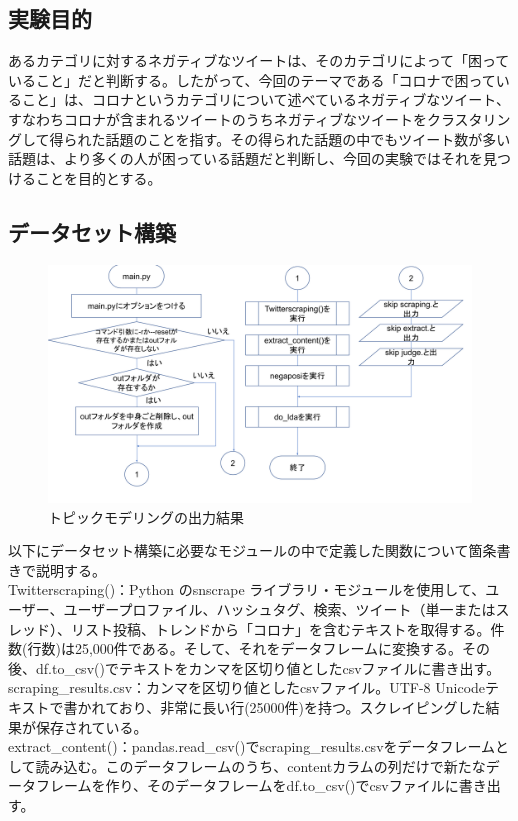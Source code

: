 \documentclass[a4paper, 11pt, titlepage]{jsarticle}
\begin{document}
\subsection{実験目的}
あるカテゴリに対するネガティブなツイートは、そのカテゴリによって「困っていること」だと判断する。したがって、今回のテーマである「コロナで困っていること」は、コロナというカテゴリについて述べているネガティブなツイート、すなわちコロナが含まれるツイートのうちネガティブなツイートをクラスタリングして得られた話題のことを指す。その得られた話題の中でもツイート数が多い話題は、より多くの人が困っている話題だと判断し、今回の実験ではそれを見つけることを目的とする。

\subsection{データセット構築}
\begin{figure}[H]
  \centering 
  \includegraphics[scale=0.25]{main_flowchart.png}
  \caption{トピックモデリングの出力結果}
\end{figure}
以下にデータセット構築に必要なモジュールの中で定義した関数について箇条書きで説明する。\\
\noindent
Twitterscraping()：Python のsnscrape ライブラリ・モジュールを使用して、ユーザー、ユーザープロファイル、ハッシュタグ、検索、ツイート（単一またはスレッド）、リスト投稿、トレンドから「コロナ」を含むテキストを取得する。件数(行数)は25,000件である。そして、それをデータフレームに変換する\cite{snscrape1}。その後、df.to\_csv()でテキストをカンマを区切り値としたcsvファイルに書き出す\cite{snscrape2}。\\
scraping\_results.csv：カンマを区切り値としたcsvファイル。UTF-8 Unicodeテキストで書かれており、非常に長い行(25000件)を持つ。スクレイピングした結果が保存されている。\\
extract\_content()：pandas.read\_csv()でscraping\_results.csvをデータフレームとして読み込む\cite{snscrape3}。このデータフレームのうち、contentカラムの列だけで新たなデータフレームを作り、そのデータフレームをdf.to\_csv()でcsvファイルに書き出す。\\
\end{document}
